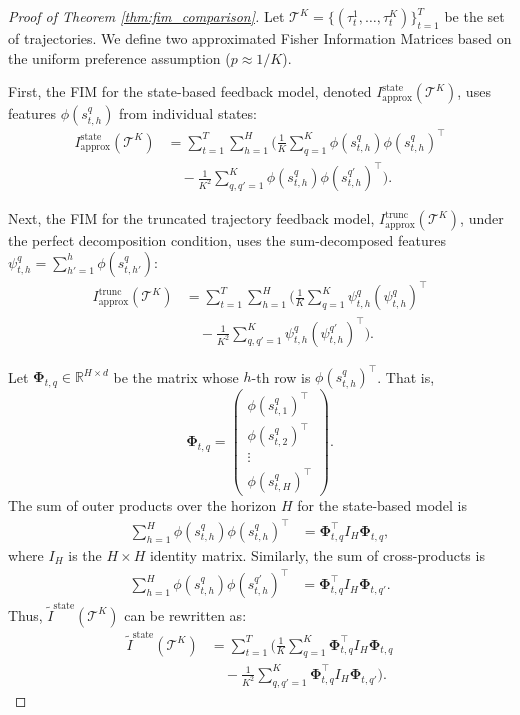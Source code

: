 \documentclass[10pt,a4paper]{amsart}
\newcommand{\bPhi}{\mathbf{\Phi}}
\begin{document}
\begin{proof}[Proof of Theorem \ref{thm:fim_comparison}]
Let $\mathcal{T}^K = \{ (\tau^1_t, \dots, \tau^K_t) \}_{t=1}^T$ be the set of trajectories.
We define two approximated Fisher Information Matrices based on the uniform preference assumption ($p \approx 1/K$).

First, the FIM for the state-based feedback model, denoted $I^{\text{state}}_{\text{approx}}(\mathcal{T}^K)$, uses features $\phi(s^q_{t,h})$ from individual states:
    \begin{align*}
    I^{\text{state}}_{\text{approx}}(\mathcal{T}^K)
    &= \sum_{t=1}^T \sum_{h=1}^H \Bigg( \frac{1}{K} \sum_{q=1}^K \phi(s^q_{t,h})\phi(s^q_{t,h})^\top \\
    &\quad - \frac{1}{K^2} \sum_{q,q'=1}^K \phi(s^q_{t,h})\phi(s^{q'}_{t,h})^\top \Bigg).
    \end{align*}

Next, the FIM for the truncated trajectory feedback model, $I^{\text{trunc}}_{\text{approx}}(\mathcal{T}^K)$, under the perfect decomposition condition, uses the sum-decomposed features $\psi^q_{t,h} = \sum_{h'=1}^h \phi(s^q_{t,h'})$:
    \begin{align*}
    I^{\text{trunc}}_{\text{approx}}(\mathcal{T}^K)
    &= \sum_{t=1}^T \sum_{h=1}^H \Bigg( \frac{1}{K} \sum_{q=1}^K \psi^q_{t,h}(\psi^q_{t,h})^\top \\
    &\quad - \frac{1}{K^2} \sum_{q,q'=1}^K \psi^q_{t,h}(\psi^{q'}_{t,h})^\top \Bigg).
    \end{align*}

Let $\bPhi_{t,q} \in \mathbb{R}^{H \times d}$ be the matrix whose $h$-th row is $\phi(s^q_{t,h})^\top$. That is,
\[ \bPhi_{t,q} = \begin{pmatrix} \phi(s^q_{t,1})^\top \\ \phi(s^q_{t,2})^\top \\ \vdots \\ \phi(s^q_{t,H})^\top \end{pmatrix}. \]
The sum of outer products over the horizon $H$ for the state-based model is
\begin{align*}
\sum_{h=1}^H \phi(s^q_{t,h})\phi(s^q_{t,h})^\top &= \bPhi_{t,q}^\top I_H \bPhi_{t,q},
\end{align*}
where $I_H$ is the $H \times H$ identity matrix. Similarly, the sum of cross-products is
\begin{align*}
\sum_{h=1}^H \phi(s^q_{t,h})\phi(s^{q'}_{t,h})^\top &= \bPhi_{t,q}^\top I_H \bPhi_{t,q'}.
\end{align*}
Thus, $\tilde{I}^{\text{state}}(\mathcal{T}^K)$ can be rewritten as:
\begin{align*}
\tilde{I}^{\text{state}}(\mathcal{T}^K)
&= \sum_{t=1}^T \Bigg( \frac{1}{K} \sum_{q=1}^K \bPhi_{t,q}^\top I_H \bPhi_{t,q} \\
&\quad - \frac{1}{K^2} \sum_{q,q'=1}^K \bPhi_{t,q}^\top I_H \bPhi_{t,q'} \Bigg).
\end{align*}


\end{proof}
\end{document}
